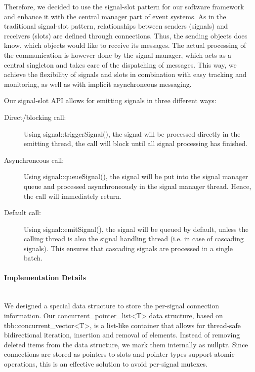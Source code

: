 Therefore, we decided to use the signal-slot pattern for our software framework and enhance it with the central manager part of event systems.
As in the traditional signal-slot pattern, relationships between senders (signals) and receivers (slots) are defined through connections.
Thus, the sending objects does know, which objects would like to receive its messages.
The actual processing of the communication is however done by the signal manager, which acts as a central singleton and takes care of the dispatching of messages.
This way, we achieve the flexibility of signals and slots in combination with easy tracking and monitoring, as well as with implicit asynchroneous messaging.

Our signal-slot API allows for emitting signals in three different ways:
\begin{description}
	\item[Direct/blocking call:]
	Using signal::triggerSignal(), the signal will be processed directly in the emitting thread, the call will block until all signal processing has finished.
	
	\item[Asynchroneous call:]
	Using signal::queueSignal(), the signal will be put into the signal manager queue and processed asynchroneously in the signal manager thread.
	Hence, the call will immediately return.
	
	\item[Default call:]
	Using signal::emitSignal(), the signal will be queued by default, unless the calling thread is also the signal handling thread (i.e. in case of cascading signals). 
	This ensures that cascading signals are processed in a single batch.
\end{description}

\paragraph{Implementation Details}~\\
We designed a special data structure to store the per-signal connection information.
Our concurrent\_pointer\_list<T> data structure, based on tbb::concurrent\_vector<T>, is a list-like container that allows for thread-safe bidirectional iteration, insertion and removal of elements. 
Instead of removing deleted items from the data structure, we mark them internally as nullptr.
Since connections are stored as pointers to slots and pointer types support atomic operations, this is an effective solution to avoid per-signal mutexes.

